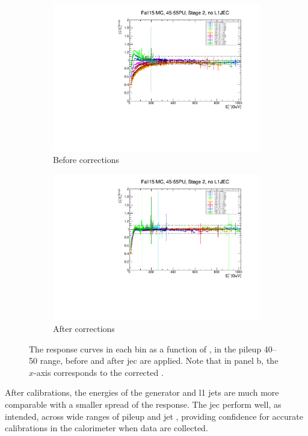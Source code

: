 \begin{figure}[htbp]
    \centering
    \begin{subfigure}[b]{0.48\textwidth}
        \includegraphics[width=\textwidth]{./figures/jecs/response_before.pdf}
        \caption{Before corrections}
        \label{fig:detector_jecs_response_before}
    \end{subfigure}
    \hfill
    \begin{subfigure}[b]{0.48\textwidth}
        \includegraphics[width=\textwidth]{./figures/jecs/response_after.pdf}
        \caption{After corrections}
        \label{fig:detector_jecs_response_after}
    \end{subfigure}
\caption[The response curves in each \abseta bin as a function of \ptLOne, in the pileup 40--50 range, before and after jet energy corrections are applied]{The response curves in each \abseta bin as a function of \ptLOne, in the \gls{pileup} 40--50 range, before and after \gls{jec} are applied. Note that in panel b, the $x$-axis corresponds to the corrected \ptLOne.}
\label{fig:detector_jecs_response}
\end{figure}

After calibrations, the energies of the generator and \acrshort{l1} \glspl{jet} are much more comparable with a smaller spread of the response. The \acrlong{jec} perform well, as intended, across wide ranges of pileup and \gls{jet} \pt, providing confidence for accurate calibrations in the calorimeter when data are collected.
